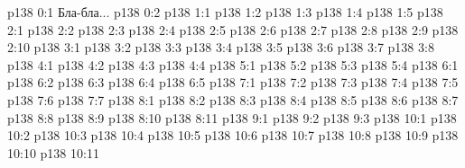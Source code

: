 \author{Промежуточные создания}
\vs p138 0:1  Бла-бла...
\vs p138 0:2 
\vs p138 1:1 
\vs p138 1:2 
\vs p138 1:3 
\vs p138 1:4 
\vs p138 1:5 
\vs p138 2:1 
\vs p138 2:2 
\vs p138 2:3 
\vs p138 2:4 
\vs p138 2:5 
\vs p138 2:6 
\vs p138 2:7 
\vs p138 2:8 
\vs p138 2:9 
\vs p138 2:10 \pc 
{}
\vs p138 3:1 
\vs p138 3:2 
\vs p138 3:3 \pc 
\vs p138 3:4 \pc 
\vs p138 3:5 
\vs p138 3:6 
\vs p138 3:7 
\vs p138 3:8 
\vs p138 4:1 
\vs p138 4:2 \pc 
\vs p138 4:3 \pc 
\vs p138 4:4 
\vs p138 5:1 
\vs p138 5:2 \pc 
\vs p138 5:3 
\vs p138 5:4 
\vs p138 6:1 
\vs p138 6:2 
\vs p138 6:3 \pc 
\vs p138 6:4 
\vs p138 6:5 
\vs p138 7:1 
\vs p138 7:2 
\vs p138 7:3 
\vs p138 7:4 
\vs p138 7:5 
\vs p138 7:6 
\vs p138 7:7 
\vs p138 8:1 
\vs p138 8:2 
\vs p138 8:3 
\vs p138 8:4 
\vs p138 8:5 
\vs p138 8:6 \pc 
\vs p138 8:7 
\vs p138 8:8 \pc 
\vs p138 8:9 
\vs p138 8:10 \pc 
\vs p138 8:11 
\vs p138 9:1 
\vs p138 9:2 
\vs p138 9:3 \pc 
{}
\vs p138 10:1 
\vs p138 10:2 
\vs p138 10:3 
\vs p138 10:4 
\vs p138 10:5 
\vs p138 10:6 
\vs p138 10:7 
\vs p138 10:8 
\vs p138 10:9 
\vs p138 10:10 
\vs p138 10:11 \pc 
\quizlink
